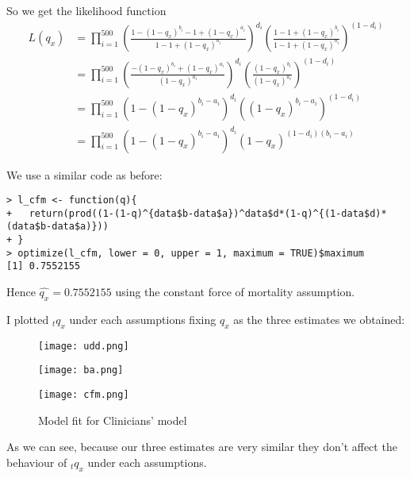 \documentclass[a4paper,11pt]{article}
\theoremstyle{mytheor}
\begin{document}
So we get the likelihood function
\begin{align*}
    L(q_x) & = \prod_{i = 1}^{500}\left(\frac{1 - (1-q_x)^{b_i} -1 + (1-q_x)^{a_i}}{1 -1 + (1-q_x)^{a_i}}\right)^{d_i}\left(\frac{1 - 1 + (1-q_x)^{b_i}}{1 - 1 + (1-q_x)^{a_i}}\right)^{(1-d_i)} \\
    & = \prod_{i = 1}^{500}\left(\frac{ - (1-q_x)^{b_i} + (1-q_x)^{a_i}}{ (1-q_x)^{a_i}}\right)^{d_i}\left(\frac{(1-q_x)^{b_i}}{ (1-q_x)^{a_i}}\right)^{(1-d_i)} \\
    & = \prod_{i = 1}^{500}\left(1 - (1-q_x)^{b_i - a_i} \right)^{d_i}\left((1-q_x)^{b_i -a_i}\right)^{(1-d_i)}\\
    & = \prod_{i = 1}^{500}\left( 1- (1-q_x)^{b_i - a_i} \right)^{d_i}(1-q_x)^{(1-d_i)(b_i -a_i)}
\end{align*}

We use a similar code as before:
\begin{lstlisting}[label={list:second},caption=Code to estimate $q_x$ under the constant force of mortality assumption]
> l_cfm <- function(q){
+   return(prod((1-(1-q)^{data$b-data$a})^data$d*(1-q)^{(1-data$d)*(data$b-data$a)}))
+ }
> optimize(l_cfm, lower = 0, upper = 1, maximum = TRUE)$maximum
[1] 0.7552155
\end{lstlisting}

Hence $\hat{q_x} = 0.7552155$ using the constant force of mortality assumption.

\vspace{5ex}

I plotted $_tq_x$ under each assumptions fixing $q_x$ as the three estimates we obtained:

\begin{figure}[h!]
\centering
\begin{minipage}[t]{0.45\linewidth}
    \texttt{[image: udd.png]}
\end{minipage}
\begin{minipage}[t]{0.45\linewidth}
    \texttt{[image: ba.png]}
\end{minipage}
\begin{minipage}[t]{0.45\linewidth}
    \texttt{[image: cfm.png]}
\end{minipage}
\caption{Model fit for Clinicians' model} 
\label{fig5}
\end{figure}

As we can see, because our three estimates are very similar they don't affect the behaviour of $_tq_x$ under each assumptions.
\end{document}
